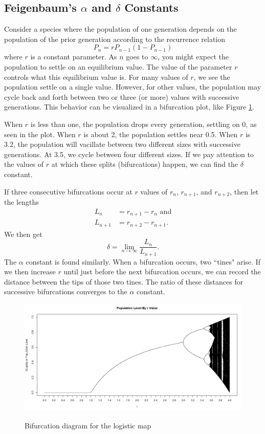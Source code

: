 \documentclass[12pt]{article}
\begin{document}
\subsection{Feigenbaum's $\alpha$ and $\delta$ Constants}
Consider a species where the population of one generation depends on the population of the prior generation according to the recurrence relation
\begin{equation*}
P_n = r P_{n-1} \left( 1 - P_{n-1} \right)
\end{equation*}
where $r$ is a constant parameter. As $n$ goes to $\infty$, you might expect the population to settle on an equilibrium value. The value of the parameter $r$ controls what this equilibrium value is. For many values of $r$, we see the population settle on a single value. However, for other values, the population may cycle back and forth between two or three (or more) values with successive generations. This behavior can be visualized in a bifurcation plot, like Figure \ref{figure:bif}.

When $r$ is less than one, the population drops every generation, settling on 0, as seen in the plot. When $r$ is about 2, the population settles near 0.5. When $r$ is 3.2, the population will vacillate between two different sizes with successive generations. At 3.5, we cycle between four different sizes. If we pay attention to the values of $r$ at which these splits (bifurcations) happen, we can find the $\delta$ constant. 

If three consecutive bifurcations occur at $r$ values of $r_n$, $r_{n+1}$, and $r_{n+2}$, then let the lengths 
\begin{align*}
L_n &= r_{n+1} - r_n \text{ and}\\
L_{n+1} &= r_{n+2} - r_{n+1}.
\end{align*}
We then get
\begin{equation*}
\delta = \lim_{n \rightarrow \infty}\frac{L_n}{L_{n+1}}.
\end{equation*}
The $\alpha$ constant is found similarly. When a bifurcation occurs, two ``tines" arise. If we then increase $r$ until just before the next bifurcation occurs, we can record the distance between the tips of those two tines. The ratio of these distances for successive bifurcations converges to the $\alpha$ constant.
\begin{figure}[h]
\centering
\caption{Bifurcation diagram for the logistic map}
\includegraphics[scale=0.5]{pop_by_r.png}
\label{figure:bif}
\end{figure}
\end{document}
